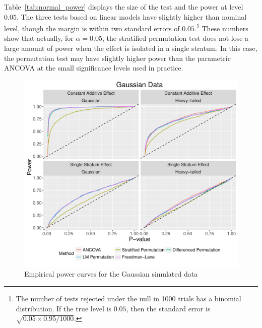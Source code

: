 \documentclass[11pt]{article}
\begin{document}
Table~\ref{tab:normal_power} displays the size of the test and the power at level $0.05$.
The three tests based on linear models have slightly higher than nominal level, though the margin is within two standard errors of $0.05$.\footnote{
The number of tests rejected under the null in 1000 trials has a binomial distribution.
If the true level is $0.05$, then the standard error is $\sqrt{0.05 \times 0.95/1000}$.}
These numbers show that actually, for $\alpha=0.05$, the stratified permutation test does not lose a large amount of power when the effect is isolated in a single stratum.
In this case, the permutation test may have slightly higher power than the parametric ANCOVA at the small significance levels used in practice.
\begin{figure}[h]
\centering
\includegraphics[width = \textwidth]{fig/normal_simulation_power}
\caption{Empirical power curves for the Gaussian simulated data}
\label{fig:normal_sim_power}
\end{figure}
\begin{center}

\end{center}
\end{document}
